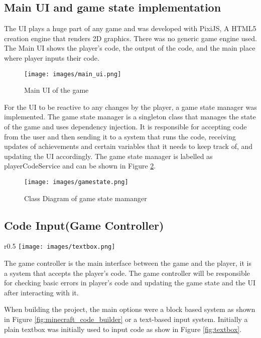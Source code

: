 \subsection{Main UI and game state implementation}
The UI plays a huge part of any game and was developed with PixiJS, A HTML5 creation engine that renders 2D graphics. There was no generic game engine used. The Main UI shows the player's code, the output of the code, and the main place where player inputs their code.

\begin{figure}[H]
    \centering
    \texttt{[image: images/main\_ui.png]}
    \caption{Main UI of the game}    
    \label{fig:main_ui}
\end{figure}
For the UI to be reactive to any changes by the player, a game state manager was implemented. The game state manager is a singleton class that manages the state of the game and uses dependency injection. It is responsible for accepting code from the user and then sending it to a system that runs the code, receiving updates of achievements and certain variables that it needs to keep track of, and updating the UI accordingly. The game state manager is labelled as playerCodeService and can be shown in Figure \ref{fig:game_state}.
\begin{figure}[H]
    \centering
    \texttt{[image: images/gamestate.png]}
    \caption{Class Diagram of game state mamanger}    
    \label{fig:game_state}
\end{figure}

\subsection{Code Input(Game Controller)}
\begin{wrapfigure}{r}{0.5\textwidth}
    \centering
    \texttt{[image: images/textbox.png]}
    \caption{Simple basic text box (\cite{azatbekuly2023enhancing})}
    \label{fig:textbox}
\end{wrapfigure}
The game controller is the main interface between the game and the player, it is a system that accepts the player's code. The game controller will be responsible for checking basic errors in player's code and updating the game state and the UI after interacting with it. 

When building the project, the main options were a block based system as shown in Figure \ref{fig:minecraft_code_builder} or a text-based input system. Initially a plain textbox was initially used to input code as show in Figure \ref{fig:textbox}. 


